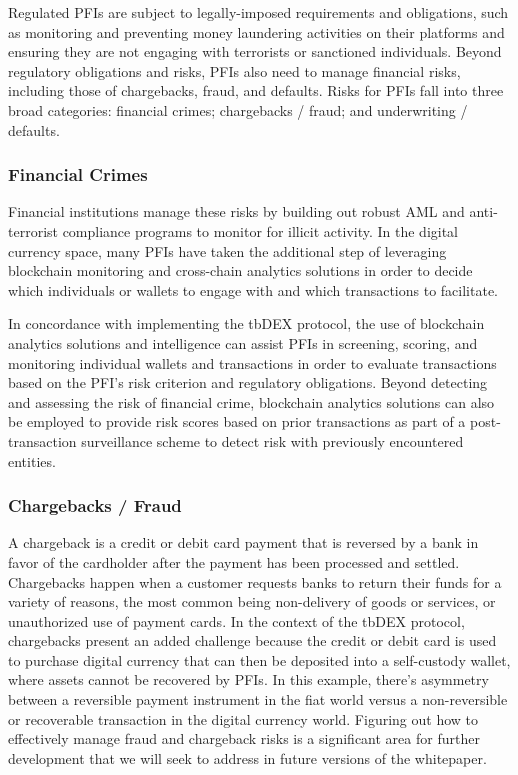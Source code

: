\documentclass[11pt]{article}
\begin{document}
\vspace{1\baselineskip}
Regulated PFIs are subject to legally-imposed requirements and obligations, such as monitoring and preventing money laundering activities on their platforms and ensuring they are not engaging with terrorists or sanctioned individuals. Beyond regulatory obligations and risks, PFIs also need to manage financial risks, including those of chargebacks, fraud, and defaults.  Risks for PFIs fall into three broad categories: financial crimes; chargebacks / fraud; and underwriting / defaults.

\subsubsection{Financial Crimes}

Financial institutions manage these risks by building out robust AML and anti-terrorist compliance programs to monitor for illicit activity. In the digital currency space, many PFIs have taken the additional step of leveraging blockchain monitoring and cross-chain analytics solutions in order to decide which individuals or wallets to engage with and which transactions to facilitate.

\vspace{1\baselineskip}
In concordance with implementing the tbDEX protocol, the use of blockchain analytics solutions and intelligence can assist PFIs in screening, scoring, and monitoring individual wallets and transactions in order to evaluate transactions based on the PFI’s risk criterion and regulatory obligations. Beyond detecting and assessing the risk of financial crime, blockchain analytics solutions can also be employed to provide risk scores based on prior transactions as part of a post-transaction surveillance scheme to detect risk with previously encountered entities. 

\subsubsection{Chargebacks / Fraud}

A chargeback is a credit or debit card payment that is reversed by a bank in favor of the cardholder after the payment has been processed and settled. Chargebacks happen when a customer requests banks to return their funds for a variety of reasons, the most common being non-delivery of goods or services, or unauthorized use of payment cards. In the context of the tbDEX protocol, chargebacks present an added challenge because the credit or debit card is used to purchase digital currency that can then be deposited into a self-custody wallet, where assets cannot be recovered by PFIs. In this example, there’s asymmetry between a reversible payment instrument in the fiat world versus a non-reversible or recoverable transaction in the digital currency world. Figuring out how to effectively manage fraud and chargeback risks is a significant area for further development that we will seek to address in future versions of the whitepaper.
\end{document}
